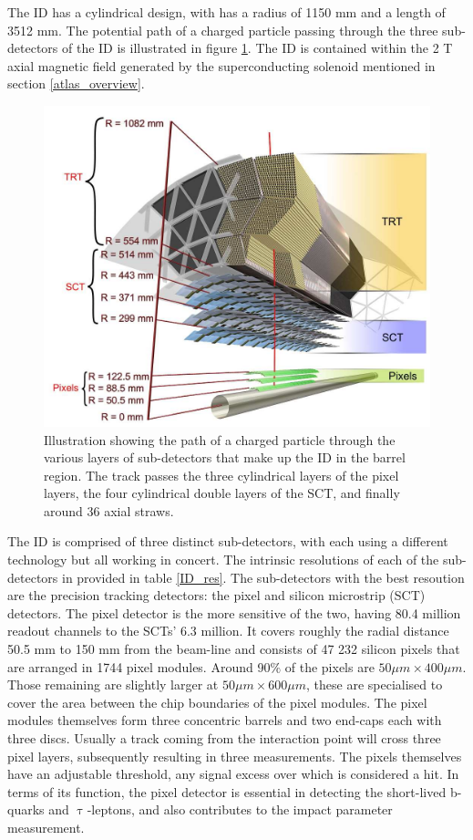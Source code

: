 The ID has a cylindrical design, with has a radius of 1150 mm and a length of 3512 mm. The potential path of a charged particle passing through the three sub-detectors of the ID is illustrated in figure \ref{inner}. The ID is contained within the 2 T axial magnetic field generated by the superconducting solenoid mentioned in section \ref{atlas_overview}.
\begin{figure}
\centering
\includegraphics[scale=0.75]{images/image_inner_detector.jpg}
\caption{Illustration showing the path of a charged particle through the various layers of sub-detectors that make up the ID in the barrel region. The track passes the three cylindrical layers of the pixel layers, the four cylindrical double layers of the SCT, and finally around 36 axial straws. \cite{ATLAS}}
\label{inner}
\end{figure}
The ID is comprised of three distinct sub-detectors, with each using a different technology but all working in concert. The intrinsic resolutions of each of the sub-detectors in provided in table \ref{ID_res}. The sub-detectors with the best resoution are the precision tracking detectors: the pixel and silicon microstrip (SCT) detectors. The pixel detector is the more sensitive of the two, having 80.4 million readout channels to the SCTs' 6.3 million. It covers roughly the radial distance 50.5 mm to 150 mm from the beam-line and consists of 47 232 silicon pixels that are arranged in 1744 pixel modules. Around 90$\%$ of the pixels are $50 \mu m \times 400 \mu m$. Those remaining are slightly larger at $50 \mu m \times 600 \mu m$, these are specialised to cover the area between the chip boundaries of the pixel modules. The pixel modules themselves form three concentric barrels and two end-caps each with three discs. Usually a track coming from the interaction point will cross three pixel layers, subsequently resulting in three measurements. The pixels themselves have an adjustable threshold, any signal excess over which is considered a hit. In terms of its function, the pixel detector is essential in detecting the short-lived b-quarks and $\uptau$-leptons, and also contributes to the impact parameter measurement.
